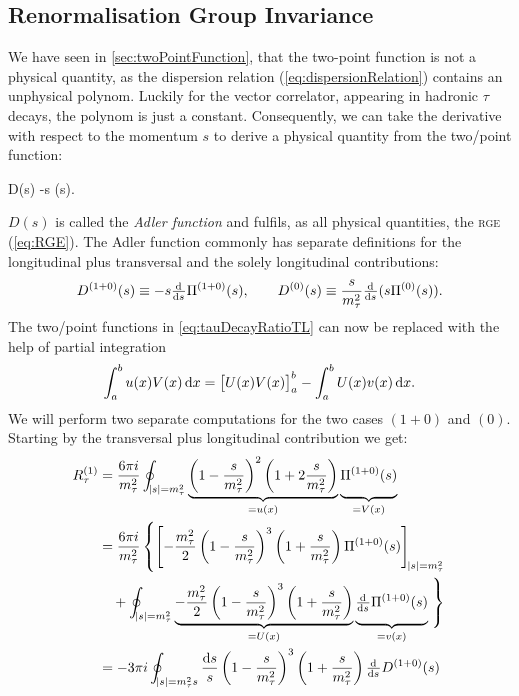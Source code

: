 \documentclass[../../index.tex]{subfiles}
\begin{document}
\subsection{Renormalisation Group Invariance}
We have seen in \cref{sec:twoPointFunction}, that the two-point function is not
a physical quantity, as the dispersion relation (\cref{eq:dispersionRelation})
contains an unphysical polynom. Luckily for the vector correlator, appearing in
hadronic \(\tau\) decays, the polynom is just a constant. Consequently, we can
take the derivative with respect to the momentum \(s\) to derive a physical
quantity from the two\-/point function:
\begin{tcolorbox}
  D(s) \equiv -s  \Pi(s).
\end{tcolorbox}
\(D(s)\) is called the \textit{Adler function} and fulfils, as all physical
quantities, the \textsc{rge} (\cref{eq:RGE}). The Adler function commonly has
separate definitions for the longitudinal plus transversal and the solely
longitudinal contributions:
\begin{equation}
  \label{eq:adlerFunction}
  D^{(1+0)}(s) \equiv -s \od{}{s} \Pi^{(1+0)}(s), \qquad D^{(0)}(s) \equiv \frac{s}{m_\tau^2} \od{}{s} (s \Pi^{(0)}(s)).
\end{equation}
The two\-/point functions in \cref{eq:tauDecayRatioTL} can now be replaced with
the help of partial integration
\begin{equation}
  \int_a^b u(x) V(x) \dif x = \left[ U(x) V(x) \right]_a^b - \int_a^b U(x) v(x) \dif x.
\end{equation}
We will perform two separate computations for the two cases \((1+0)\) and
\((0)\). Starting by the transversal plus longitudinal contribution we get:
\begin{equation}
  \begin{split}
    R_\tau^{(1)} &= \frac{6 \pi i}{m_\tau^2}
    \oint_{\abs{s}=m_\tau^2}\underbrace{ \left( 1 - \frac{s}{m_\tau^2} \right)^2
      \left( 1 + 2 \frac{s}{m_\tau^2} \right)
    }_{= u(x)} \underbrace{ \vphantom{\left( \frac{s}{m_\tau^2} \right)} \Pi^{(1+0)}(s)}_{=V(x)} \\
    &= \frac{6 \pi i}{m_\tau^2} \left\{ \left[ -\frac{m_\tau^2}{2} \left( 1 -
          \frac{s}{m_\tau^2} \right)^3 \left( 1 + \frac{s}{m_\tau^2} \right)
        \Pi^{(1+0)}(s) \right]_{\abs{s}=m_\tau^2} \right. \\
    &\quad+ \oint_{\abs{s}=m_\tau^2} \underbrace{-\frac{m_\tau^2}{2} \left( 1 -
        \frac{s}{m_\tau^2} \right)^3 \left( 1 + \frac{s}{m_\tau^2} \right)
    }_{=U(x)} \underbrace{\vphantom{\left( \frac{1}{m_\tau^2} \right)}\od{}{s}
      \Pi^{(1+0)}(s)}_{=v(x)}
    \left. \vphantom{\left[ \left( \frac{1}{m_\tau^2} \right) \right]} \right\} \\
    &= -3 \pi i \oint_{\abs{s}=m_\tau^2s} \frac{\dif s}{s} \left( 1 -
      \frac{s}{m_\tau^2} \right)^3 \left( 1 + \frac{s}{m_\tau^2} \right)
    \od{}{s} D^{(1+0)}(s)
  \end{split}
\end{equation}
\end{document}
